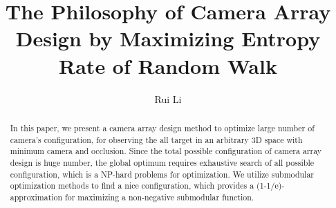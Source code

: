 \documentclass[lettersize,journal,onecolumn]{IEEEtran}
\begin{document}
\title{The Philosophy of Camera Array Design by Maximizing Entropy Rate of Random Walk}

\author{Rui Li}



\maketitle

\def\eg{\emph{e.g.}}
\def\Eg{\emph{E.g.}}
\def\etal{\emph{et al.}}

\newcommand\todo[1]{{\color{orange}TODO: #1}}
\newcommand\revised[1]{{\color{red}#1}}
\newcommand\idea[1]{{\color{blue}IDEA:#1}}
\newcommand\eqnref[1]{Eqn.~(\ref{#1})}
\newcommand\figref[1]{Fig.~(\ref{#1})}
\newcommand\secref[1]{Sec.~\ref{#1}}
\newcommand\tabref[1]{Tab.~\ref{#1}}

\newcommand{\T}{\mathbf{T}}
\newcommand{\svl}{\hat{\mathbf{s}}} %
\newcommand{\svg}{\mathbf{s}} %
\newcommand{\svt}{\mathbf{S}} %
\newcommand\mm[1]{\mathcal{#1}}
\newcommand\sv[1]{\mathcal{#1}}
\newcommand{\note}[1]{{\em{\textcolor{orange}{#1}}}}

\begin{abstract}
In this paper, we present a camera array design method to optimize large number of camera’s configuration, for observing the all target in an arbitrary 3D space with minimum camera and occlusion. Since the total possible configuration of camera array design is huge number, the global optimum requires exhaustive search of all possible configuration, which is a NP-hard problems for optimization. We utilize submodular optimization methods to find a nice configuration, which provides a (1-1/e)-approximation for maximizing a non-negative submodular function.
\end{abstract}






%
%
%
%
%
%
%
%
%
%
%
%
%
%
%	
%	
\vfill
\end{document}
